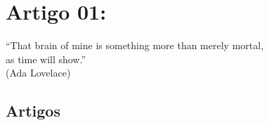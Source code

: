 \chapter{Artigo 01: }
\label{cap:paper_01}

\begin{flushright}
    ``That brain of mine is something more than merely mortal,\\ as time will show.''\\
    (Ada Lovelace)
    \end{flushright}

\section{Artigos}
